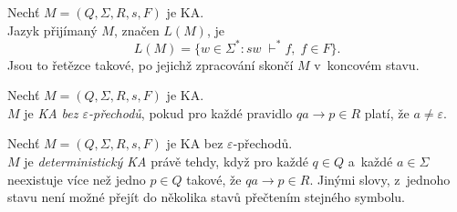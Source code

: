 \begin{definition}
    Nechť $M = (Q, \Sigma, R, s, F)$ je KA.\\
    Jazyk přijímaný $M$, značen $L(M)$, je
    \begin{equation*}
        L(M) = \{w \in \Sigma^*: sw\; \vdash^* f,\; f \in F\}.
    \end{equation*}
    Jsou to řetězce takové, po jejichž zpracování skončí $M$ v~koncovém stavu.
\end{definition}


\begin{definition}
    Nechť $M = (Q, \Sigma, R, s, F)$ je KA.\\
    $M$ je \emph{KA bez $\varepsilon$-přechodů}, pokud pro každé pravidlo $qa \rightarrow p \in R$ platí, že $a \neq \varepsilon$.
\end{definition}

\begin{definition}
    Nechť $M = (Q, \Sigma, R, s, F)$ je KA bez $\varepsilon$-přechodů.\\
    $M$ je \emph{deterministický KA} právě tehdy, když pro každé $q \in Q$ a~každé $a \in \Sigma$ neexistuje více než jedno $p \in Q$ takové, že $qa \rightarrow p \in R$.
    Jinými slovy, z~jednoho stavu není možné přejít do několika stavů přečtením stejného symbolu.
\end{definition}


